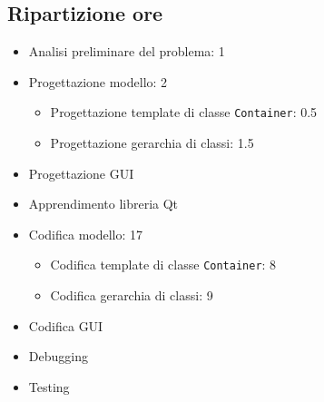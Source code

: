 \documentclass{article}
\begin{document}
\subsection{Ripartizione ore} %
\label{sub:ripartizione_ore}
\begin{itemize}
	\item Analisi preliminare del problema: 1
	\item Progettazione modello: 2
	\begin{itemize}
		\item Progettazione template di classe \verb|Container|: 0.5
		\item Progettazione gerarchia di classi: 1.5
	\end{itemize}
	\item Progettazione GUI
	\item Apprendimento libreria Qt
	\item Codifica modello: 17
	\begin{itemize}
		\item Codifica template di classe \verb|Container|: 8
		\item Codifica gerarchia di classi: 9
	\end{itemize}
	\item Codifica GUI
	\item Debugging
	\item Testing
\end{itemize}
\end{document}

